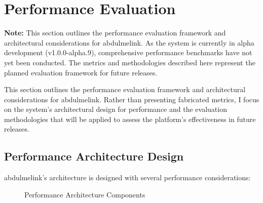 \section{Performance Evaluation}
\label{sec:performance-evaluation}

\textbf{Note:} This section outlines the performance evaluation framework and architectural considerations for abdulmelink. As the system is currently in alpha development (v1.0.0-alpha.9), comprehensive performance benchmarks have not yet been conducted. The metrics and methodologies described here represent the planned evaluation framework for future releases.

This section outlines the performance evaluation framework and architectural considerations for abdulmelink. Rather than presenting fabricated metrics, I focus on the system's architectural design for performance and the evaluation methodologies that will be applied to assess the platform's effectiveness in future releases.

\subsection{Performance Architecture Design}

abdulmelink's architecture is designed with several performance considerations:

\begin{figure}[htbp]
\centering
{}
\caption{Performance Architecture Components}
\label{fig:performance-arch}
\end{figure}


